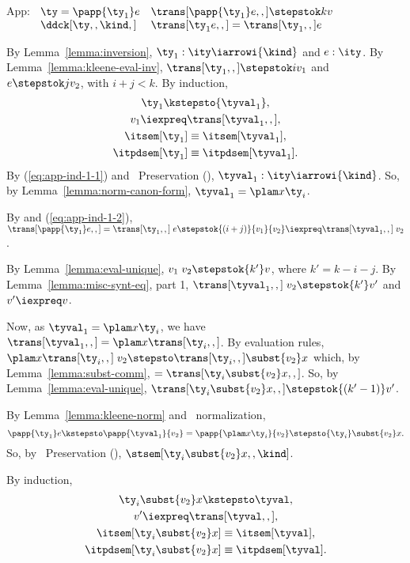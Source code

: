 \begin{list}{\textbf{Proof:}}{
      \setlength{\leftmargin}{0in}
      \setlength{\listparindent}{0in}}
\begin{caseproof}
\item App: \quad
$\begin{array}[t]{ll}
  \ty = \papp {\ty_1} e & \trans[\papp {\ty_1} e,,] \stepstok k v \\
  \ddck[\ty,,\kind,] & \trans[{\ty_1} e,,] = \trans[{\ty_1},,] e
\end{array}$

By Lemma~\ref{lemma:inversion},
  ${\ty_1} : \ity \iarrowi {\kind}$ and $e: \ity$.
By Lemma~\ref{lemma:kleene-eval-inv},
  $\trans[{\ty_1},,] \stepstok i {v_1}$
and
$e \stepstok j {v_2}$, with $i+j < k$.
By induction,
\begin{gather}
  {\ty_1} \kstepsto {\tyval_1},\label{eq:app-ind-1-1} \\
  {v_1} \iexpreq \trans[{\tyval_1},,],  \label{eq:app-ind-1-2}\\
  \itsem[{\ty_1}] \equiv \itsem[{\tyval_1}], \\
  \itpdsem[{\ty_1}] \equiv \itpdsem[{\tyval_1}].
\end{gather}
By (\ref{eq:app-ind-1-1}) and \ddc\ Preservation
(), ${\tyval_1}:\ity \iarrowi {\kind}$.
So, by Lemma~\ref{lemma:norm-canon-form}, ${\tyval_1} = \plam x {}
{\ty_i}$.

By  and (\ref{eq:app-ind-1-2}),
  $\trans[\papp {\ty_1} e,,] = \trans[{\ty_1},,] \; e \stepstok {(i+j)} {v_1}
  {v_2}   \iexpreq \trans[{\tyval_1},,] \; {v_2} $.

By Lemma~\ref{lemma:eval-unique},
   ${v_1}\; {v_2} \stepstok {k'} v$, where $k' = k - i - j$.
By Lemma~\ref{lemma:misc-synt-eq}, part 1,
  $\trans[{\tyval_1},,] \; {v_2} \stepstok {k'} v'$ and $v' \iexpreq v$.

Now, as  ${\tyval_1} = \plam x {}
{\ty_i}$, we have 
   $\trans[{\tyval_1},,] = \plam x {} {\trans[{\ty_i},,]}$. By evaluation rules,
   $\plam x {} {\trans[{\ty_i},,]} \; {v_2} \stepsto \trans[{\ty_i},,]\subst {v_2} x$
which, by Lemma~\ref{lemma:subst-comm},
   $= \trans[{\ty_i} \subst {v_2} x,,]$.
So, by Lemma~\ref{lemma:eval-unique},
  $\trans[{\ty_i}\subst {v_2} x,,] \stepstok {(k'-1)} v'$.

By Lemma~\ref{lemma:kleene-norm} and \ddc\ normalization,
\[
  \papp {\ty_1} e \kstepsto \papp {\tyval_1} {v_2} = \papp {\plam x
    {} {\ty_i}} {v_2} \stepsto {\ty_i}\subst {v_2} x.
\] 
So, by \ddc\ Preservation
(),  $\stsem[{{\ty_i}\subst {v_2} x},{},{{\kind}}]$.
 
By induction,
\begin{gather}
  {\ty_i}\subst {v_2} x \kstepsto \tyval,\\
  v' \iexpreq \trans[\tyval,,],\\
  \itsem[{\ty_i}\subst {v_2} x] \equiv \itsem[\tyval],\\
  \itpdsem[{\ty_i}\subst {v_2} x] \equiv \itpdsem[\tyval].
\end{gather}


\end{caseproof}
\end{list}
